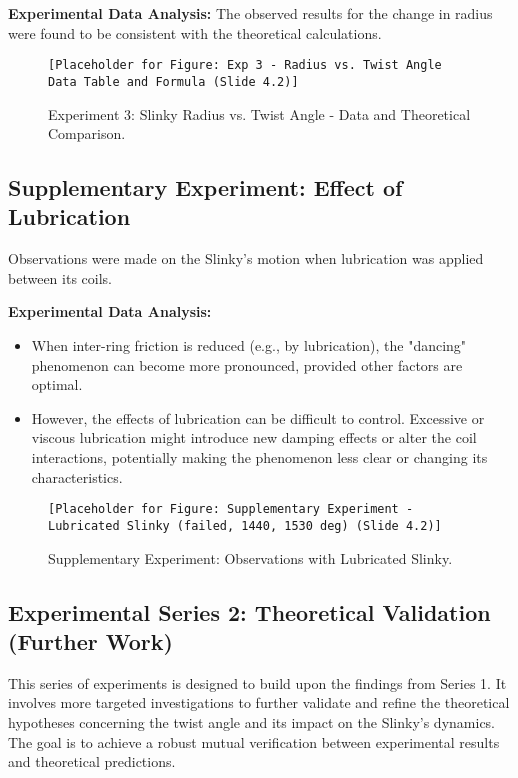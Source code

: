 \documentclass{mcmthesis}  %
\begin{document}
\textbf{Experimental Data Analysis:} The observed results for the change in radius were found to be consistent with the theoretical calculations.

\begin{figure}[h!]
    \centering
    \texttt{[Placeholder for Figure: Exp 3 - Radius vs. Twist Angle Data Table and Formula (Slide 4.2)]}
    \caption{Experiment 3: Slinky Radius vs. Twist Angle - Data and Theoretical Comparison.}
    \label{fig:exp3_radius_data}
\end{figure}

\subsection{Supplementary Experiment: Effect of Lubrication}
Observations were made on the Slinky's motion when lubrication was applied between its coils.

\textbf{Experimental Data Analysis:}
\begin{itemize}
    \item When inter-ring friction is reduced (e.g., by lubrication), the "dancing" phenomenon can become more pronounced, provided other factors are optimal.
    \item However, the effects of lubrication can be difficult to control. Excessive or viscous lubrication might introduce new damping effects or alter the coil interactions, potentially making the phenomenon less clear or changing its characteristics.
\end{itemize}

\begin{figure}[h!]
    \centering
    \texttt{[Placeholder for Figure: Supplementary Experiment - Lubricated Slinky (failed, 1440, 1530 deg) (Slide 4.2)]}
    \caption{Supplementary Experiment: Observations with Lubricated Slinky.}
    \label{fig:supplementary_lubrication}
\end{figure}

\subsection{Experimental Series 2: Theoretical Validation (Further Work)}
This series of experiments is designed to build upon the findings from Series 1. It involves more targeted investigations to further validate and refine the theoretical hypotheses concerning the twist angle and its impact on the Slinky's dynamics. The goal is to achieve a robust mutual verification between experimental results and theoretical predictions.
\end{document}
